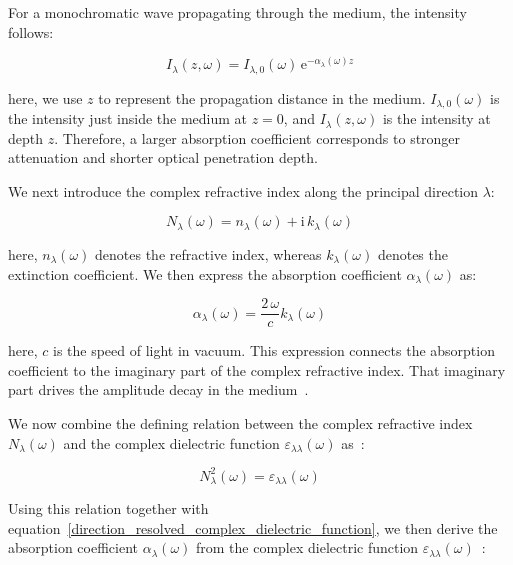 For a monochromatic wave propagating through the medium,
the intensity follows:

\begin{equation}
    I_{\lambda}(z,\omega)= I_{\lambda,0}(\omega)\,\mathrm{e}^{-\alpha_{\lambda}(\omega) z}
\label{intensity_attenuation_from_absorption_coefficient}
\end{equation}

here, we use $z$ to represent the propagation distance in the medium.
$I_{\lambda,0}(\omega)$ is the intensity just inside the medium at $z=0$,
and $I_{\lambda}(z,\omega)$ is the intensity at depth $z$.
Therefore, a larger absorption coefficient corresponds to
stronger attenuation and shorter optical penetration depth.

We next introduce the complex refractive index along the
principal direction $\lambda$:

\begin{equation}
    N_{\lambda}(\omega) = n_{\lambda}(\omega) +\mathrm{i}\, k_{\lambda}(\omega)
\label{complex_refractive_index_for_absorption_coefficient}
\end{equation}

here, $n_{\lambda}(\omega)$ denotes the refractive index,
whereas $k_{\lambda}(\omega)$ denotes the extinction coefficient.
We then express the absorption coefficient $\alpha_{\lambda}(\omega)$ as:

\begin{equation}
    \alpha_{\lambda}(\omega)
    = \frac{2\,\omega}{c}k_{\lambda}(\omega)
\label{absorption_coefficient_from_extinction_coefficient}
\end{equation}

here, $c$ is the speed of light in vacuum.
This expression connects the absorption coefficient to the imaginary part of the complex refractive index.
That imaginary part drives the amplitude decay in the medium~\cite{wooten2013optical, dressel2002electrodynamics,fox2010optical,gajdovs2006linear}.

We now combine the defining relation between the complex
refractive index $N_{\lambda}(\omega)$
and the complex dielectric function $\varepsilon_{\lambda\lambda}(\omega)$ as~\cite{born2013principles}:

\begin{equation}
    N_{\lambda}^{2}(\omega)= \varepsilon_{\lambda\lambda}(\omega)
\label{refractive_index_dielectric_relation}
\end{equation}

Using this relation together with equation~\eqref{direction_resolved_complex_dielectric_function},
we then derive the absorption coefficient $\alpha_{\lambda}(\omega)$ from the complex dielectric function $\varepsilon_{\lambda\lambda}(\omega)$~\cite{born2013principles}:

